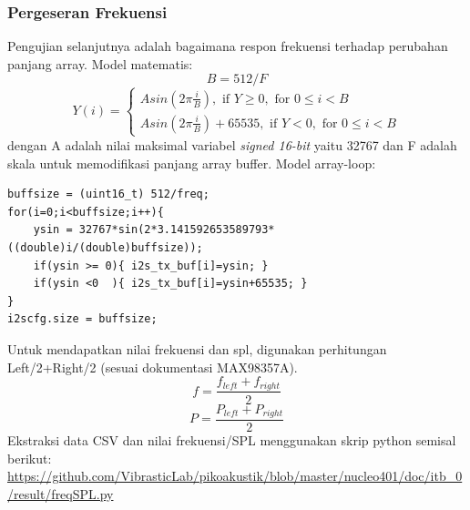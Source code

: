 \documentclass[12pt,]{article}
\begin{document}
  	\subsubsection{Pergeseran Frekuensi}
  	Pengujian selanjutnya adalah bagaimana respon frekuensi terhadap perubahan panjang array.
  	Model matematis:
  	\[ B = 512/F \]
  	\[
  	Y(i) =
  	\begin{cases}
  	A sin(2 \pi \frac{i}{B}), \text{ if } Y \geq 0, \text{ for } 0 \leq i < B\\
  	A sin(2 \pi \frac{i}{B})+65535, \text{ if } Y < 0, \text{ for } 0 \leq i < B
  	\end{cases}
  	\]
  	dengan A adalah nilai maksimal variabel \textit{signed 16-bit} yaitu 32767
  	dan F adalah skala untuk memodifikasi panjang array buffer.
  	Model array-loop:
  	\begin{verbatim}
buffsize = (uint16_t) 512/freq;
for(i=0;i<buffsize;i++){
	ysin = 32767*sin(2*3.141592653589793*((double)i/(double)buffsize));
	if(ysin >= 0){ i2s_tx_buf[i]=ysin; }
	if(ysin <0  ){ i2s_tx_buf[i]=ysin+65535; }
}
i2scfg.size = buffsize;
  	\end{verbatim}
  	Untuk mendapatkan nilai frekuensi dan spl, digunakan perhitungan Left/2+Right/2 (sesuai dokumentasi MAX98357A).
  	\[ f = \frac{f_{left} + f_{right}}{2}  \]
  	\[ P = \frac{P_{left} + P_{right}}{2}  \]
  	Ekstraksi data CSV dan nilai frekuensi/SPL menggunakan skrip python semisal berikut:\\
  	\url{https://github.com/VibrasticLab/pikoakustik/blob/master/nucleo401/doc/itb_0/result/freqSPL.py}
\end{document}
